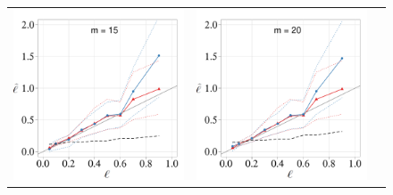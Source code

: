 \documentclass[onecolumn,a4paper,11pt]{article}
\begin{document}
\begin{figure}
\begin{flushleft}
\begin{tabular}{ccc}
\includegraphics[scale=0.31, trim = 25mm 24mm 7mm 10mm, clip]{ch5_fig8_Tlscale_vs_Elscale_part2.pdf} & \hspace{-4mm} \includegraphics[scale=0.31, trim = 25mm 24mm 7mm 10mm, clip]{ch5_fig8_Tlscale_vs_Elscale_part3.pdf} \\ 

\end{tabular}
\end{flushleft}
\end{figure}
\end{document}
